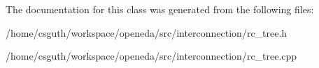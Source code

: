 The documentation for this class was generated from the following files\-:\begin{DoxyCompactItemize}
\item 
/home/csguth/workspace/openeda/src/interconnection/rc\-\_\-tree.\-h\item 
/home/csguth/workspace/openeda/src/interconnection/rc\-\_\-tree.\-cpp\end{DoxyCompactItemize}
